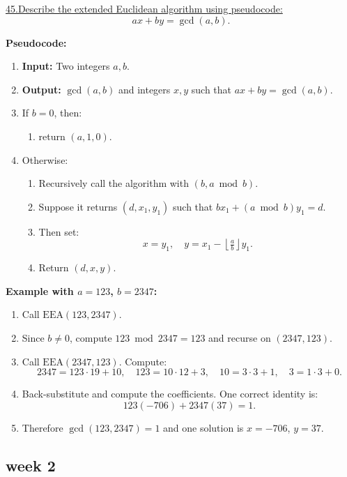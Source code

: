 \documentclass[12pt]{article}
\begin{document}
\newpage
\noindent\underline{45.\;Describe the extended Euclidean algorithm using pseudocode:}
\[ax + by = \gcd(a,b).\]

\noindent\textbf{Pseudocode:}
\begin{enumerate}
    \item \textbf{Input:} Two integers $a, b$.
    \item \textbf{Output:} $\gcd(a,b)$ and integers $x, y$ such that $ax + by = \gcd(a,b)$.
    \item If $b = 0$, then:
    \begin{enumerate}
        \item return $(a, 1, 0)$.
    \end{enumerate}
    \item Otherwise:
    \begin{enumerate}
        \item Recursively call the algorithm with $(b, a \bmod b)$.
        \item Suppose it returns $(d, x_1, y_1)$ such that $bx_1 + (a \bmod b) y_1 = d$.
        \item Then set:
        \[
        x = y_1, \quad y = x_1 - \left\lfloor \tfrac{a}{b} \right\rfloor y_1.
        \]
        \item Return $(d, x, y)$.
    \end{enumerate}
\end{enumerate}

\noindent\textbf{Example with $a=123$, $b=2347$:}

\begin{enumerate}
    \item Call $\text{EEA}(123,2347)$.
    \item Since $b \neq 0$, compute $123 \bmod 2347 = 123$ and recurse on $(2347,123)$.
    \item Call $\text{EEA}(2347,123)$. Compute:
    \[
    2347 = 123\cdot 19 + 10,\quad 123 = 10\cdot 12 + 3,\quad 10 = 3\cdot3 + 1,\quad 3 = 1\cdot3 + 0.
    \]
    \item Back-substitute and compute the coefficients. One correct identity is:
    \[
    123(-706) + 2347(37) = 1.
    \]
    \item Therefore $\gcd(123,2347) = 1$ and one solution is $x=-706$, $y=37$.
\end{enumerate}

\newpage
\subsection*{week 2}
\end{document}
